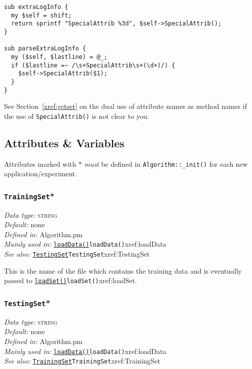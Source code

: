 \documentclass[a4paper]{article}
\begin{document}
\begin{verbatim}
sub extraLogInfo {
  my $self = shift;
  return sprintf "SpecialAttrib %3d", $self->SpecialAttrib();
}

sub parseExtraLogInfo {
  my ($self, $lastline) = @_;
  if ($lastline =~ /\s+SpecialAttrib\s+(\d+)/) {
    $self->SpecialAttrib($1);
  }
}
\end{verbatim} %

See Section~\ref{xref:getset} on the dual use of attribute names as method
names if the use of \texttt{SpecialAttrib()} is not clear to you.

\subsection{Attributes \& Variables}

Attributes marked with * \emph{must} be defined in
\texttt{Algorithm::\_init()} for each new application/experiment.

\subsubsection{\texttt{TrainingSet}*}\label{xref:TrainingSet}
\begin{flushleft}
\textit{Data type:} \textsc{string}\\
\textit{Default:} none\\
\textit{Defined in:} Algorithm.pm\\
\textit{Mainly used in:} \hyperref[no]{\texttt{loadData()}}{\texttt{loadData()}}{xref:loadData}\\
\textit{See also:} \hyperref[no]{\texttt{TestingSet}}{\texttt{TestingSet}}{xref:TestingSet}
\end{flushleft}

This is the name of the file which contains the training data and is
eventually passed to \hyperref[no]{\texttt{loadSet()}}{\texttt{loadSet()}}{xref:loadSet}.

\subsubsection{\texttt{TestingSet}*}\label{xref:TestingSet}
\begin{flushleft}
\textit{Data type:} \textsc{string}\\
\textit{Default:} none\\
\textit{Defined in:} Algorithm.pm\\
\textit{Mainly used in:} \hyperref[no]{\texttt{loadData()}}{\texttt{loadData()}}{xref:loadData}\\
\textit{See also:} \hyperref[no]{\texttt{TrainingSet}}{\texttt{TrainingSet}}{xref:TrainingSet}
\end{flushleft}
\end{document}
